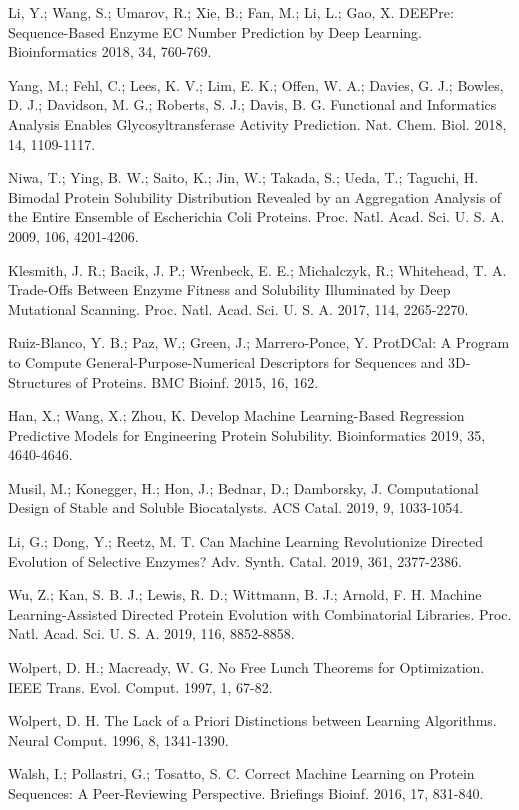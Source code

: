 \documentclass[12pt]{article}
\begin{document}
\begin{thebibliography}{20}
 Li, Y.; Wang, S.; Umarov, R.; Xie, B.; Fan, M.; Li, L.; Gao, X. DEEPre: Sequence-Based Enzyme EC Number Prediction by Deep Learning. Bioinformatics 2018, 34, 760-769.

 Yang, M.; Fehl, C.; Lees, K. V.; Lim, E. K.; Offen, W. A.; Davies, G. J.; Bowles, D. J.; Davidson, M. G.; Roberts, S. J.; Davis, B. G. Functional and Informatics Analysis Enables Glycosyltransferase Activity Prediction. Nat. Chem. Biol. 2018, 14, 1109-1117.

 Niwa, T.; Ying, B. W.; Saito, K.; Jin, W.; Takada, S.; Ueda, T.; Taguchi, H. Bimodal Protein Solubility Distribution Revealed by an Aggregation Analysis of the Entire Ensemble of Escherichia Coli Proteins. Proc. Natl. Acad. Sci. U. S. A. 2009, 106, 4201-4206.

 Klesmith, J. R.; Bacik, J. P.; Wrenbeck, E. E.; Michalczyk, R.; Whitehead, T. A. Trade-Offs Between Enzyme Fitness and Solubility Illuminated by Deep Mutational Scanning. Proc. Natl. Acad. Sci. U. S. A. 2017, 114, 2265-2270.

 Ruiz-Blanco, Y. B.; Paz, W.; Green, J.; Marrero-Ponce, Y. ProtDCal: A Program to Compute General-Purpose-Numerical Descriptors for Sequences and 3D-Structures of Proteins. BMC Bioinf. 2015, 16, 162.

 Han, X.; Wang, X.; Zhou, K. Develop Machine Learning-Based Regression Predictive Models for Engineering Protein Solubility. Bioinformatics 2019, 35, 4640-4646.

 Musil, M.; Konegger, H.; Hon, J.; Bednar, D.; Damborsky, J. Computational Design of Stable and Soluble Biocatalysts. ACS Catal. 2019, 9, 1033-1054.

 Li, G.; Dong, Y.; Reetz, M. T. Can Machine Learning Revolutionize Directed Evolution of Selective Enzymes? Adv. Synth. Catal. 2019, 361, 2377-2386. 

 Wu, Z.; Kan, S. B. J.; Lewis, R. D.; Wittmann, B. J.; Arnold, F. H. Machine Learning-Assisted Directed Protein Evolution with Combinatorial Libraries. Proc. Natl. Acad. Sci. U. S. A. 2019, 116, 8852-8858.

 Wolpert, D. H.; Macready, W. G. No Free Lunch Theorems for Optimization. IEEE Trans. Evol. Comput. 1997, 1, 67-82.

 Wolpert, D. H. The Lack of a Priori Distinctions between Learning Algorithms. Neural Comput. 1996, 8, 1341-1390.

 Walsh, I.; Pollastri, G.; Tosatto, S. C. Correct Machine Learning on Protein Sequences: A Peer-Reviewing Perspective. Briefings Bioinf. 2016, 17, 831-840.


\end{thebibliography}
\end{document}
